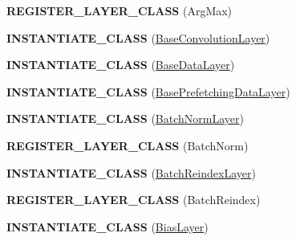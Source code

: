 \begin{DoxyCompactItemize}
\item 
{\bfseries R\+E\+G\+I\+S\+T\+E\+R\+\_\+\+L\+A\+Y\+E\+R\+\_\+\+C\+L\+A\+SS} (Arg\+Max)\hypertarget{namespacecaffe_a79f84e906ff54893c196d28de2767c5a}{}\label{namespacecaffe_a79f84e906ff54893c196d28de2767c5a}

\item 
{\bfseries I\+N\+S\+T\+A\+N\+T\+I\+A\+T\+E\+\_\+\+C\+L\+A\+SS} (\hyperlink{classcaffe_1_1BaseConvolutionLayer}{Base\+Convolution\+Layer})\hypertarget{namespacecaffe_a0a20063c5a8b34a67394ab4237c94773}{}\label{namespacecaffe_a0a20063c5a8b34a67394ab4237c94773}

\item 
{\bfseries I\+N\+S\+T\+A\+N\+T\+I\+A\+T\+E\+\_\+\+C\+L\+A\+SS} (\hyperlink{classcaffe_1_1BaseDataLayer}{Base\+Data\+Layer})\hypertarget{namespacecaffe_a17835b8aa42fe0d7351aa3069fa62a26}{}\label{namespacecaffe_a17835b8aa42fe0d7351aa3069fa62a26}

\item 
{\bfseries I\+N\+S\+T\+A\+N\+T\+I\+A\+T\+E\+\_\+\+C\+L\+A\+SS} (\hyperlink{classcaffe_1_1BasePrefetchingDataLayer}{Base\+Prefetching\+Data\+Layer})\hypertarget{namespacecaffe_a06ec5bd1a6534ff0711a051d23199cf5}{}\label{namespacecaffe_a06ec5bd1a6534ff0711a051d23199cf5}

\item 
{\bfseries I\+N\+S\+T\+A\+N\+T\+I\+A\+T\+E\+\_\+\+C\+L\+A\+SS} (\hyperlink{classcaffe_1_1BatchNormLayer}{Batch\+Norm\+Layer})\hypertarget{namespacecaffe_a3711ef90d1290fdd74a31b910c1b5f30}{}\label{namespacecaffe_a3711ef90d1290fdd74a31b910c1b5f30}

\item 
{\bfseries R\+E\+G\+I\+S\+T\+E\+R\+\_\+\+L\+A\+Y\+E\+R\+\_\+\+C\+L\+A\+SS} (Batch\+Norm)\hypertarget{namespacecaffe_a134b681f007b80469a53c86c053888e1}{}\label{namespacecaffe_a134b681f007b80469a53c86c053888e1}

\item 
{\bfseries I\+N\+S\+T\+A\+N\+T\+I\+A\+T\+E\+\_\+\+C\+L\+A\+SS} (\hyperlink{classcaffe_1_1BatchReindexLayer}{Batch\+Reindex\+Layer})\hypertarget{namespacecaffe_ac47c1db98ed016502b029ddb5fc400ec}{}\label{namespacecaffe_ac47c1db98ed016502b029ddb5fc400ec}

\item 
{\bfseries R\+E\+G\+I\+S\+T\+E\+R\+\_\+\+L\+A\+Y\+E\+R\+\_\+\+C\+L\+A\+SS} (Batch\+Reindex)\hypertarget{namespacecaffe_af0e00e7d1a29ab0928d8821564beb9f4}{}\label{namespacecaffe_af0e00e7d1a29ab0928d8821564beb9f4}

\item 
{\bfseries I\+N\+S\+T\+A\+N\+T\+I\+A\+T\+E\+\_\+\+C\+L\+A\+SS} (\hyperlink{classcaffe_1_1BiasLayer}{Bias\+Layer})\hypertarget{namespacecaffe_a16602990ae6ded779ba02e58f1d15faf}{}\label{namespacecaffe_a16602990ae6ded779ba02e58f1d15faf}


\end{DoxyCompactItemize}
